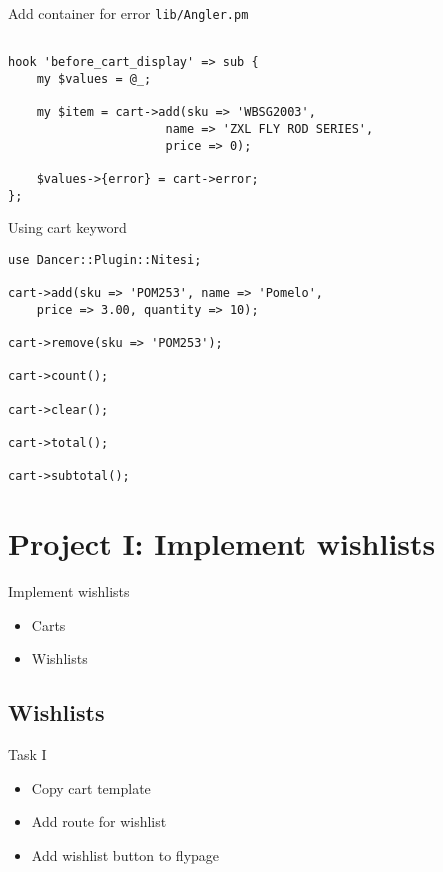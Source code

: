 \begin{frame}[fragile]{Add container for error}
\verb|lib/Angler.pm|

\begin{lstlisting}

hook 'before_cart_display' => sub {
    my $values = @_;

    my $item = cart->add(sku => 'WBSG2003',
                      name => 'ZXL FLY ROD SERIES',
                      price => 0);

    $values->{error} = cart->error;
};
\end{lstlisting}
\end{frame}

\begin{frame}[fragile]{Using cart keyword}
\begin{lstlisting}
use Dancer::Plugin::Nitesi;

cart->add(sku => 'POM253', name => 'Pomelo',
    price => 3.00, quantity => 10);

cart->remove(sku => 'POM253');

cart->count();

cart->clear();

cart->total();

cart->subtotal();
\end{lstlisting}
\end{frame}

\section{Project I: Implement wishlists}
\begin{frame}{Implement wishlists}
\begin{itemize}
\item Carts
\item Wishlists
\end{itemize}
\end{frame}



\subsection{Wishlists}

\begin{frame}{Task I}
\begin{itemize}
\item Copy cart template
\item Add route for wishlist
\item Add wishlist button to flypage
\end{itemize}
\end{frame}

